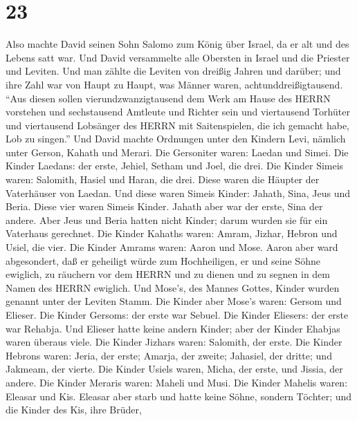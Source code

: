 \hypertarget{section-22}{%
\section{23}\label{section-22}}

 Also machte David seinen Sohn Salomo zum König über Israel,
da er alt und des Lebens satt war.  Und David versammelte
alle Obersten in Israel und die Priester und Leviten.  Und
man zählte die Leviten von dreißig Jahren und darüber; und ihre Zahl war
von Haupt zu Haupt, was Männer waren, achtunddreißigtausend.
 ``Aus diesen sollen vierundzwanzigtausend dem Werk am Hause
des HERRN vorstehen und sechstausend Amtleute und Richter sein
 und viertausend Torhüter und viertausend Lobsänger des
HERRN mit Saitenspielen, die ich gemacht habe, Lob zu singen.''
 Und David machte Ordnungen unter den Kindern Levi, nämlich
unter Gerson, Kahath und Merari.  Die Gersoniter waren:
Laedan und Simei.  Die Kinder Laedans: der erste, Jehiel,
Setham und Joel, die drei.  Die Kinder Simeis waren:
Salomith, Hasiel und Haran, die drei. Diese waren die Häupter der
Vaterhäuser von Laedan.  Und diese waren Simeis Kinder:
Jahath, Sina, Jeus und Beria. Diese vier waren Simeis Kinder.
 Jahath aber war der erste, Sina der andere. Aber Jeus und
Beria hatten nicht Kinder; darum wurden sie für ein Vaterhaus gerechnet.
 Die Kinder Kahaths waren: Amram, Jizhar, Hebron und Usiel,
die vier.  Die Kinder Amrams waren: Aaron und Mose. Aaron
aber ward abgesondert, daß er geheiligt würde zum Hochheiligen, er und
seine Söhne ewiglich, zu räuchern vor dem HERRN und zu dienen und zu
segnen in dem Namen des HERRN ewiglich.  Und Mose's, des
Mannes Gottes, Kinder wurden genannt unter der Leviten Stamm.
 Die Kinder aber Mose's waren: Gersom und Elieser.
 Die Kinder Gersoms: der erste war Sebuel. 
Die Kinder Eliesers: der erste war Rehabja. Und Elieser hatte keine
andern Kinder; aber der Kinder Ehabjas waren überaus viele.
 Die Kinder Jizhars waren: Salomith, der erste.
 Die Kinder Hebrons waren: Jeria, der erste; Amarja, der
zweite; Jahasiel, der dritte; und Jakmeam, der vierte.  Die
Kinder Usiels waren, Micha, der erste, und Jissia, der andere.
 Die Kinder Meraris waren: Maheli und Musi. Die Kinder
Mahelis waren: Eleasar und Kis.  Eleasar aber starb und
hatte keine Söhne, sondern Töchter; und die Kinder des Kis, ihre Brüder,
